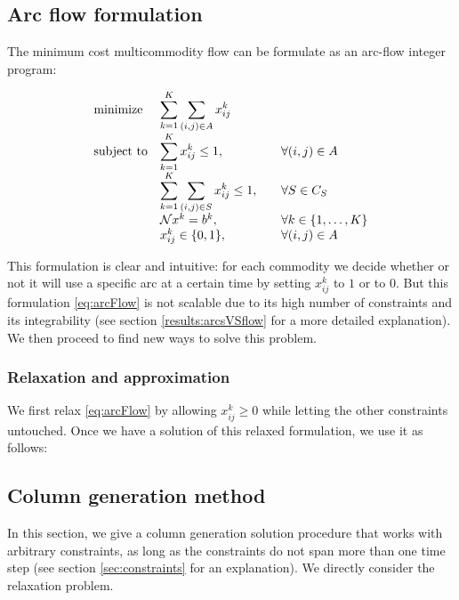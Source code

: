 \documentclass[14pt,a4paper]{article}
\theoremstyle{definition}
\numberwithin{equation}{subsection}
\begin{document}
\subsection{Arc flow formulation}

The minimum cost multicommodity flow can be formulate as an arc-flow integer program: 

\begin{equation}
\begin{array}{ll@{}ll}
\text{minimize}  & \displaystyle\sum\limits_{k=1}^{K}\sum_{(i,j)\in A} x_{ij}^k &\\
\text{subject to}& \displaystyle\sum\limits_{k=1}^{K}   x_{ij}^k \leq 1,  &\forall (i,j) \in A \\
& \displaystyle\sum\limits_{k=1}^{K}\sum_{(i,j) \in S}   x_{ij}^k \leq 1, \quad \quad  &\forall S \in C_S \\
& \mathcal{N}x^k = b^k,  &\forall k \in \{1,\ldots,K\}\\
&                                                x_{ij}^k \in \{0,1\}, & \forall (i,j)\in A
\end{array}
\label{eq:arcFlow}
\end{equation}


This formulation is clear and intuitive: for each commodity we decide whether or not it will use a specific arc at a certain time by setting $x_{ij}^k$ to $1$ or to $0$. But this formulation \eqref{eq:arcFlow} is not scalable due to its high number of constraints and its integrability (see section \ref*{results:arcsVSflow} for a more detailed explanation). We then proceed to find new ways to solve this problem.


\subsubsection{Relaxation and approximation}

We first relax \eqref{eq:arcFlow} by allowing $x_{ij}^k \geq 0$ while letting the other constraints untouched. 
Once we have a solution of this relaxed formulation, we use it as follows:


\subsection{Column generation method}

In this section, we give a column generation solution procedure that works with arbitrary constraints, as long as the constraints do not span more than one time step (see section \ref*{sec:constraints} for an explanation). We directly consider the relaxation problem.
\end{document}
